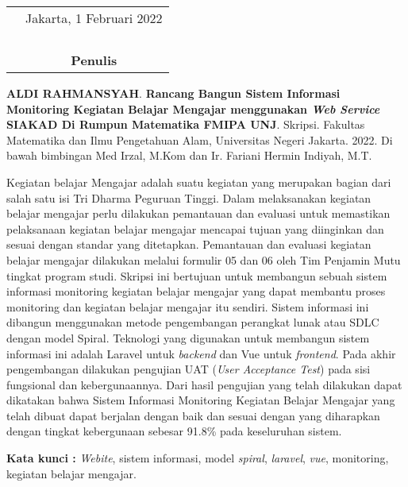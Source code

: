 \documentclass{jtetiskripsi}
\begin{document}
\begin{tabular}{p{7.5cm}c}
	&Jakarta, 1 Februari 2022\\
	&\\
	&\\
	&\\
	&\\
	&\textbf{Penulis}
\end{tabular}


\begin{abstractind}
\textbf{ALDI RAHMANSYAH}. 	\textbf{Rancang Bangun Sistem Informasi Monitoring Kegiatan Belajar Mengajar menggunakan \emph{Web Service} SIAKAD Di Rumpun Matematika FMIPA UNJ}. Skripsi. Fakultas Matematika dan Ilmu Pengetahuan Alam, Universitas Negeri Jakarta. 2022. Di bawah bimbingan Med Irzal, M.Kom dan Ir. Fariani Hermin Indiyah, M.T.
\vskip1cm
	
Kegiatan belajar Mengajar adalah suatu kegiatan yang merupakan bagian dari salah satu isi Tri Dharma Peguruan Tinggi. Dalam melaksanakan kegiatan belajar mengajar perlu dilakukan pemantauan dan evaluasi untuk memastikan pelaksanaan kegiatan belajar mengajar mencapai tujuan yang diinginkan dan sesuai dengan standar yang ditetapkan. Pemantauan dan evaluasi kegiatan belajar mengajar dilakukan melalui formulir 05 dan 06 oleh Tim Penjamin Mutu tingkat program studi. Skripsi ini bertujuan untuk membangun sebuah sistem informasi monitoring kegiatan belajar mengajar yang dapat membantu proses monitoring dan kegiatan belajar mengajar itu sendiri. Sistem informasi ini dibangun menggunakan metode pengembangan perangkat lunak atau SDLC dengan model Spiral. Teknologi yang digunakan untuk membangun sistem informasi ini adalah Laravel untuk \textit{backend} dan Vue untuk \textit{frontend}. Pada akhir pengembangan dilakukan pengujian UAT (\textit{User Acceptance Test}) pada sisi fungsional dan kebergunaannya. Dari hasil pengujian yang telah dilakukan dapat dikatakan bahwa Sistem Informasi Monitoring Kegiatan Belajar Mengajar yang telah dibuat dapat berjalan dengan baik dan sesuai dengan yang diharapkan dengan tingkat kebergunaan sebesar 91.8\% pada keseluruhan sistem.
	
	\bigskip
	\noindent
	\textbf{Kata kunci :} \textit{Webite}, sistem informasi, model \textit{spiral}, \textit{laravel}, \textit{vue}, monitoring, kegiatan belajar mengajar.
\end{abstractind}
\end{document}
